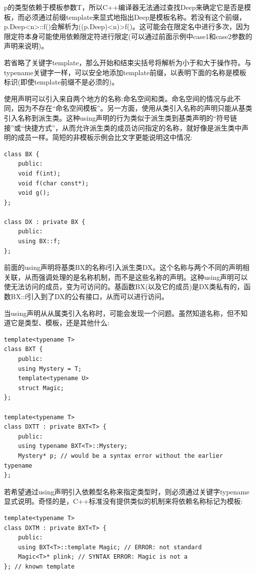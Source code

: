 p的类型依赖于模板参数T，所以C++编译器无法通过查找Deep来确定它是否是模板，而必须通过前缀template来显式地指出Deep是模板名称。若没有这个前缀，p.Deep<n>::f()会解析为((p.Deep)<n)>f()。这可能会在限定名中进行多次，因为限定符本身可能使用依赖限定符进行限定(可以通过前面示例中case1和case2参数的声明来说明)。

若省略了关键字template，那么开始和结束尖括号将解析为小于和大于操作符。与typename关键字一样，可以安全地添加template前缀，以表明下面的名称是模板标识(即使template前缀不是必须的)。


使用声明可以引入来自两个地方的名称:命名空间和类。命名空间的情况与此不同，因为不存在“命名空间模板”。另一方面，使用从类引入名称的声明只能从基类引入名称到派生类。这种using声明的行为类似于派生类到基类声明的“符号链接”或“快捷方式”，从而允许派生类的成员访问指定的名称，就好像是派生类中声明的成员一样。简短的非模板示例会比文字更能说明这中情况:

\begin{lstlisting}[style=styleCXX]
class BX {
	public:
	void f(int);
	void f(char const*);
	void g();
};

class DX : private BX {
	public:
	using BX::f;
};
\end{lstlisting}

前面的using声明将基类BX的名称f引入派生类DX。这个名称与两个不同的声明相关联，从而强调处理的是名称机制，而不是这些名称的声明。这种using声明可以使无法访问的成员，变为可访问的。基函数BX(以及它的成员)是DX类私有的，函数BX::f引入到了DX的公有接口，从而可以进行访问。

当using声明从从属类引入名称时，可能会发现一个问题。虽然知道名称，但不知道它是类型、模板，还是其他什么:

\begin{lstlisting}[style=styleCXX]
template<typename T>
class BXT {
	public:
	using Mystery = T;
	template<typename U>
	struct Magic;
};

template<typename T>
class DXTT : private BXT<T> {
	public:
	using typename BXT<T>::Mystery;
	Mystery* p; // would be a syntax error without the earlier typename
};
\end{lstlisting}

若希望通过using声明引入依赖型名称来指定类型时，则必须通过关键字typename显式说明。奇怪的是，C++标准没有提供类似的机制来将依赖名称标记为模板:

\begin{lstlisting}[style=styleCXX]
template<typename T>
class DXTM : private BXT<T> {
	public:
	using BXT<T>::template Magic; // ERROR: not standard
	Magic<T>* plink; // SYNTAX ERROR: Magic is not a
}; // known template
\end{lstlisting}

